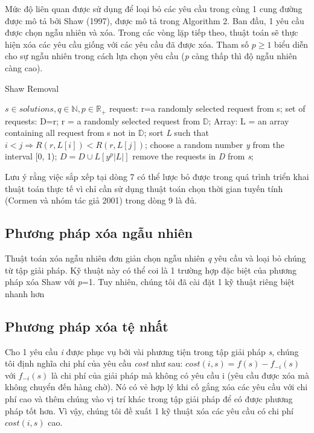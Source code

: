 Mức độ liên quan được sử dụng để loại bỏ các yêu cầu trong cùng 1 cung đường được mô tả bởi Shaw (1997), được mô tả trong Algorithm 2. Ban đầu, 1 yêu cầu được chọn ngẫu nhiên và xóa. Trong các vòng lặp tiếp theo, thuật toán sẽ thực hiện xóa các yêu cầu giống với các yêu cầu đã được xóa. Tham số $p \geqslant 1$ biểu diễn cho sự ngẫu nhiên trong cách lựa chọn yêu cầu (\textit{p} càng thấp thì độ ngẫu nhiên càng cao).

\begin{algorithm}
	\caption{Shaw Removal} 
	\begin{algorithmic}[1]
        \Require $s \in {solutions}, q \in \mathbb{N}, p \in \mathbb{R}_{+}$
        \State request: r=a randomly selected request from s;
        \State set of requests: D={r};
		  \State r = a randomly selected request from $\mathbb{D}$;
            \State Array: L = an array containing all request from s not in $\mathbb{D}$;
            \State sort \textit{L} such that $i<j \Rightarrow R(r, L\left[ i \right]) < R(r, L\left[ j \right])$;
            \State choose a random number \textit{y} from the interval [0, 1);
            \State $D=D\cup {L \left[ y^p|L| \right]}$
        \EndWhile
    \State remove the requests in \textit{D} from \textit{s};
	\end{algorithmic} 
\end{algorithm}

Lưu ý rằng việc sắp xếp tại dòng 7 có thể lược bỏ được trong quá trình triển khai thuật toán thực tế vì chỉ cần sử dụng thuật toán chọn thời gian tuyến tính (Cormen và nhóm tác giả 2001) trong dòng 9 là đủ.

\subsection{Phương pháp xóa ngẫu nhiên}
Thuật toán xóa ngẫu nhiên đơn giản chọn ngẫu nhiên \textit{q} yêu cầu và loại bỏ chúng từ tập giải pháp. Kỹ thuật này có thể coi là 1 trường hợp đặc biệt của phương pháp xóa Shaw với \textit{p}=1. Tuy nhiên, chúng tôi đã cài đặt 1 kỹ thuật riêng biệt nhanh hơn

\subsection{Phương pháp xóa tệ nhất}
Cho 1 yêu cầu \textit{i} được phục vụ bởi vài phương tiện trong tập giải pháp \textit{s}, chúng tôi định nghĩa chi phí của yêu cầu \textit{cost} như sau: $cost(i,s)=f(s)-f_{-i}(s)$ với $f_{-i}(s)$ là chi phí của giải pháp mà không có yêu cầu i (yêu cầu được xóa mà không chuyển đến hàng chờ). Nó có vẻ hợp lý khi cố gắng xóa các yêu cầu với chi phí cao và thêm chúng vào vị trí khác trong tập giải pháp để có được phương pháp tốt hơn. Vì vậy, chúng tôi đề xuất 1 kỹ thuật xóa các yêu cầu có chi phí $cost(i, s)$ cao.

